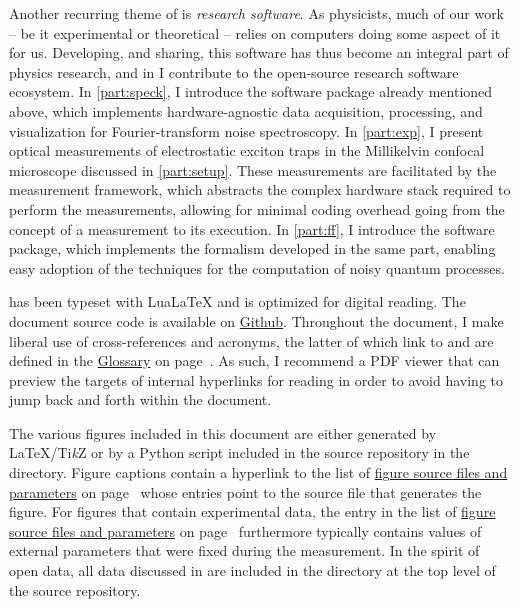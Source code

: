 Another recurring theme of \thethesis is \emph{research software}.
As physicists, much of our work -- be it experimental or theoretical -- relies on computers doing some aspect of it for us.
Developing, and sharing, this software has thus become an integral part of physics research, and in \thethesis I contribute to the open-source research software ecosystem.
In \cref{part:speck}, I introduce the \pyspeck software package already mentioned above, which implements hardware-agnostic data acquisition, processing, and visualization for Fourier-transform noise spectroscopy.
In \cref{part:exp}, I present optical measurements of electrostatic exciton traps in the Millikelvin confocal microscope discussed in \cref{part:setup}.
These measurements are facilitated by the \mjolnir measurement framework, which abstracts the complex hardware stack required to perform the measurements, allowing for minimal coding overhead going from the concept of a measurement to its execution.
In \cref{part:ff}, I introduce the \filterfunctions software package, which implements the formalism developed in the same part, enabling easy adoption of the techniques for the computation of noisy quantum processes.

\Thethesis has been typeset with Lua\LaTeX{} and is optimized for digital reading.
The document source code is available on \href{https://github.com/thangleiter/phd_thesis/}{Github}.
Throughout the document, I make liberal use of cross-references and acronyms, the latter of which link to and are defined in the \hyperref[glo]{Glossary} on page~\pageref{glo}.
As such, I recommend a PDF viewer that can preview the targets of internal hyperlinks for reading \thethesis in order to avoid having to jump back and forth within the document.

The various figures included in this document are either generated by \LaTeX{}/Ti\emph{k}Z or by a Python script included in the source repository in the  directory.
Figure captions contain a hyperlink to the list of \hyperref[lof]{figure source files and parameters} on page~\pageref{lof} whose entries point to the source file that generates the figure.
For figures that contain experimental data, the entry in the list of \hyperref[lof]{figure source files and parameters} on page~\pageref{lof} furthermore typically contains values of external parameters that were fixed during the measurement.
In the spirit of open data, all data discussed in \thethesis are included in the  directory at the top level of the source repository.

